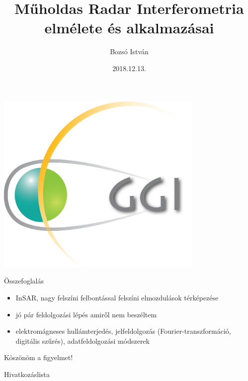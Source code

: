 \documentclass[aspectratio=169]{beamer}
\title[Műholdas Távérzékelés Labor, 2018/19.I.]{Műholdas Radar Interferometria elmélete és alkalmazásai}
\author[Bozsó István]{Bozsó István}
\institute[MTA CSFK GGI]{MTA CSFK Geodéziai és Geofizikai Intézet}
\date{2018.12.13.}
\begin{document}
\begin{frame}
    \titlepage
    \begin{center}
        \begin{minipage}[c]{0.3\textwidth}
            \includegraphics[width=0.75\textwidth]{ggi_logo.png}
        \end{minipage}
    \end{center}
\end{frame}










\begin{frame}{Összefoglalás}
    \begin{itemize}
        \item InSAR, nagy felszíni felbontással felszíni elmozdulások térképezése
        \item jó pár feldolgozási lépés amiről nem beszéltem
        \item elektromágneses hullámterjedés, jelfeldolgozás (Fourier-transzformáció, digitális szűrés), adatfeldolgozási módszerek
    \end{itemize}
\end{frame}

\begin{frame}
    \begin{center}
        \Huge \color{blue!55!black}
        Köszönöm a figyelmet!
    \end{center}
\end{frame}

\begin{frame}[allowframebreaks]{Hivatkozáslista}
        
\end{frame}
\end{document}
